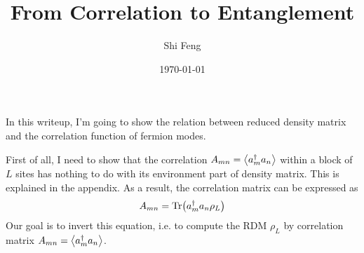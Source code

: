 \documentclass[11pt]{article}
\title{From Correlation to Entanglement}
\author{Shi Feng}
\date{\today}
\theoremstyle{remark}
\theoremstyle{definition}
\begin{document}
\maketitle
In this writeup, I'm going to show the relation between reduced density matrix and the correlation function of fermion modes. 

First of all, I need to show that the correlation $A_{mn} = \expval{a_m^\dagger a_n}$ within a block of $L$ sites has nothing to do with its environment part of density matrix. This is explained in the appendix. As a result, the correlation matrix can be expressed as
\begin{equation}
	A_{mn} = \Tr(a_m^\dagger a_n \rho_L)
\end{equation}
Our goal is to invert this equation, i.e. to compute the RDM $\rho_L$ by correlation matrix  $A_{mn} = \expval{a_m^\dagger a_n}$. 
\end{document}
